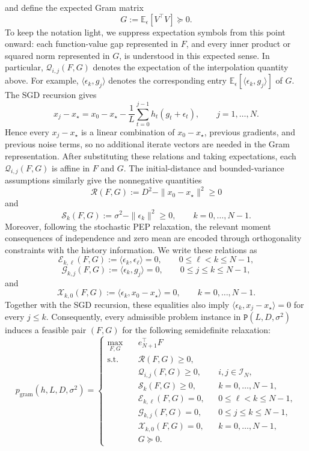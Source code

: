 and define the expected Gram matrix
\[G:=\mathbb E_\epsilon[V^\top V]\succeq0.\]
To keep the notation light, we suppress expectation symbols from this
point onward: each function-value gap represented in $F$, and every
inner product or squared norm represented in $G$, is understood in this
expected sense. In particular, $\mathcal Q_{i,j}(F,G)$ denotes the
expectation of the interpolation quantity above. For example,
$\langle\epsilon_k,g_j\rangle$ denotes the corresponding entry
$\mathbb E_\epsilon[\langle\epsilon_k,g_j\rangle]$ of $G$.
The SGD recursion gives
\[x_j-x_\star=x_0-x_\star-\frac1L\sum_{t=0}^{j-1}
h_t(g_t+\epsilon_t),\qquad j=1,\ldots,N. \]
Hence every $x_j-x_\star$ is a linear combination of
$x_0-x_\star$, previous gradients, and previous noise terms, so no
additional iterate vectors are needed in the Gram representation.
After substituting these relations and taking expectations, each
$\mathcal Q_{i,j}(F,G)$ is affine in $F$ and $G$.
The initial-distance and bounded-variance assumptions similarly give
the nonnegative quantities
\[ \mathcal R(F,G) := D^2-\|x_0-x_\star\|^2 \geq0 \]
and \[ \mathcal S_k(F,G) := \sigma^2-\|\epsilon_k\|^2 \geq0, \qquad k=0,\ldots,N-1. \]
Moreover, following the stochastic PEP relaxation, the relevant moment consequences of independence and zero mean are encoded through orthogonality constraints with the history information. We write these relations as
\[ \mathcal E_{k,\ell}(F,G) := \langle\epsilon_k,\epsilon_\ell\rangle =0, \qquad 0\leq\ell<k\leq N-1, \]
\[ \mathcal G_{k,j}(F,G) := \langle\epsilon_k,g_j\rangle =0, \qquad 0\leq j\leq k\leq N-1, \]
and
\[ \mathcal X_{k,0}(F,G) := \langle\epsilon_k,x_0-x_\star\rangle =0, \qquad k=0,\ldots,N-1. \]
Together with the SGD recursion, these equalities also imply
$\langle\epsilon_k,x_j-x_\star\rangle=0$
for every $j\leq k$.
Consequently, every admissible problem instance in
$\mathtt P(L,D,\sigma^2)$ induces a feasible pair $(F,G)$ for the
following semidefinite relaxation:
\begin{equation}
\label{eq:gram-pep}
p_{\mathrm{gram}}(h,L,D,\sigma^2) =
\left\{ \begin{aligned}
\max_{F,G}\quad
    &e_{N+1}^\top F
\\
\mathrm{s.t.}\quad
    &\mathcal R(F,G)\geq0,
\\
    &\mathcal Q_{i,j}(F,G)\geq0,
        && i,j\in\mathcal I_N,
\\
    &\mathcal S_k(F,G)\geq0,
        && k=0,\ldots,N-1,
\\
    &\mathcal E_{k,\ell}(F,G)=0,
        &&0\leq\ell<k\leq N-1,
\\
    &\mathcal G_{k,j}(F,G)=0,
        &&0\leq j\leq k\leq N-1,
\\
    &\mathcal X_{k,0}(F,G)=0,
        &&k=0,\ldots,N-1,
\\
    &G\succeq0.
\end{aligned} \right.
\end{equation}
